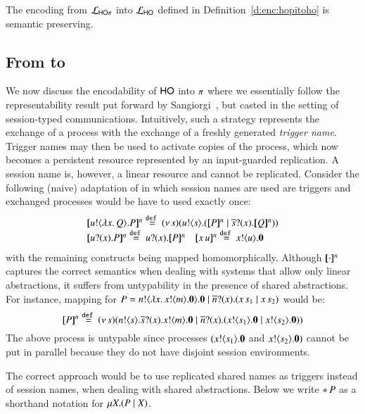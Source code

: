 \smallskip 

\begin{theorem}
\label{f:enc:hopitoho}
The encoding from $\mathcal{L}_{\mathsf{HO}\pi}$ into $\mathcal{L}_{\mathsf{HO}}$ 
defined in Definition~\ref{d:enc:hopitoho}
is semantic preserving. 
\end{theorem}

\subsection{From \HOp to \sessp}
\label{subsec:HOp_to_sessp}
\noi 
We now discuss the encodability of  $\mathsf{HO}$ into $\pi$ where
we essentially follow the representability result put forward by 
Sangiorgi~\cite{San92,SaWabook}, but casted in the setting of session-typed communications. 
Intuitively, such a strategy represents the exchange of a process with the exchange of a freshly generated \emph{trigger name}. 
Trigger names may then be used to activate copies of the process, which now becomes a persistent resource represented by an input-guarded replication.
A session name 
is, however, a linear resource and cannot be replicated.
Consider the following (naive) adaptation of \cite{San92,SaWabook} 
in which session names are used are triggers and 
exchanged processes would be have to used exactly once:
%
\[
\begin{array}{l}
		\pmap{\bout{u}{\abs{x}{Q}} P}{n}  \defeq   \newsp{s}{\bout{u}{s} (\pmap{P}{n} \Par \binp{\dual{s}}{x} \pmap{Q}{n})} \\
		\pmap{\binp{u}{x} P}{n}  \defeq \binp{u}{x} \pmap{P}{n}
\quad 
		\pmap{\appl{x}{u}}{n}  \defeq  \bout{x}{u} \inact
	\end{array}
\]
%
with the remaining \HOp constructs being mapped homomorphically.
Although $[\!\![\cdot]\!\!]^n$ captures the correct semantics when
dealing with systems that allow only linear abstractions,
it suffers from untypability in the presence
of shared abstractions. For instance,
mapping for $P = n ! \langle \lambda x.\,x ! \langle m \rangle .\mathbf{0} \rangle . \mathbf{0} \;|\; \overline{n} ? (x) . (x\, {s_1} \;|\; x\, {s_2})$
would be:
%
\[
	[\!\![P]\!\!]^n \stackrel{\mathtt{def}\ }{=}
	(\nu\, s)(n ! \langle s \rangle . \overline{s} ? (x) . x ! \langle m \rangle . \mathbf{0} \;|\; \overline{n} ? (x) . (x ! \langle s_1 \rangle . \mathbf{0} \;|\; x ! \langle s_2 \rangle . \mathbf{0}))
\]
%
The above process is untypable since processes $(x ! \langle s_1 \rangle . \mathbf{0}$ and $x ! \langle s_2 \rangle . \mathbf{0})$
cannot be put in parallel because they do not have disjoint session environments.

The correct approach would be to use replicated shared names
as triggers instead of session names, when dealing with shared abstractions. 
Below we write $\ast\,{} P$ as a shorthand notation for $\mu X. (P \;|\; X)$.

